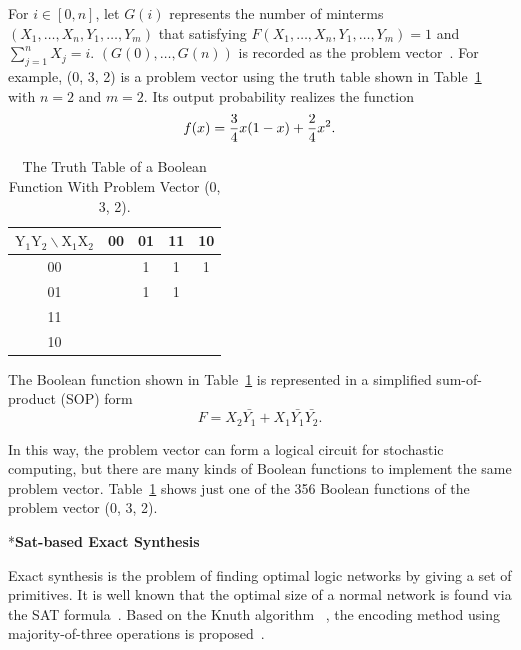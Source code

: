 \documentclass[conference,letterpaper]{IEEEtran}
\makeatletter
\renewcommand{\subsection}{\@startsection{subsection}{1}{0mm}
	{-\baselineskip}{0.001\baselineskip}{\bf\leftline}}
\makeatother
\begin{document}
For $i\in[0,n]$, let $G(i)$ represents the number of minterms $(X_{1}, \ldots, X_{n}, Y_{1}, \ldots, Y_{m})$ that satisfying $F(X_{1}, \ldots, X_{n}, Y_{1}, \ldots, Y_{m})=1$ and $\sum_{j=1}^{n} X_{j}=i$. $(G(0), \ldots, G(n))$ is recorded as the problem vector~\cite{2}. For example, (0, 3, 2) is a problem vector using the truth table shown in Table~\ref{tab:tt} with $n=2$ and $m=2$. Its output probability realizes the function
\begin{equation}
f(x)=\frac{3}{4} x(1-x)+\frac{2}{4} x^{2}.\vspace{-2ex}
\end{equation}


\begin{table}[htbp]
\setlength{\abovecaptionskip}{0.cm}
\setlength{\belowcaptionskip}{0.pt}
\setlength{\tabcolsep}{1mm}
\caption{The Truth Table of a Boolean Function With Problem Vector (0, 3, 2).}
\centering \label{tab:tt}
\begin{tabular}{|c|c|c|c|c|}
\hline $\mathrm{Y}_{1} \mathrm{Y}_{2} \backslash \mathrm{X}_{1} \mathrm{X}_{2}$ & 00 & 01 & 11 & 10 \\
\hline 00 & & 1 & 1 & 1 \\
\hline 01 & & 1 & 1 & \\
\hline 11 & & & & \\
\hline 10 & & & & \\
\hline
\end{tabular}
\end{table}

The Boolean function shown in Table~\ref{tab:tt} is represented in a simplified sum-of-product (SOP) form
\begin{equation}
F=X_{2}\bar{Y_{1}}+X_{1} \bar{Y_{1}}\bar{Y_{2}}.
\end{equation}

In this way, the problem vector can form a logical circuit for stochastic computing, but there are many kinds of Boolean functions to implement the same problem vector. Table~\ref{tab:tt} shows just one of the 356 Boolean functions of the problem vector (0, 3, 2).

\subsection*{\textbf{Sat-based Exact Synthesis}}


Exact synthesis is the problem of finding optimal logic networks by giving a set of primitives. 
It is well known that the optimal size of a normal network is found via the SAT formula~\cite{3}. Based on the Knuth algorithm ~\cite{4}, the encoding method using majority-of-three operations is proposed~\cite{6}. 
\end{document}
